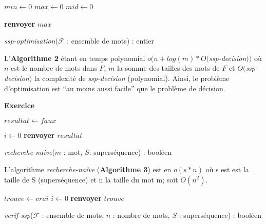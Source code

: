 \documentclass[11pt,letterpaper]{article}
\newcommand{\exo}[1]{\Large \textbf{Exercice \numprint{#1}} \vspace{10px} \normalsize}
\begin{document}
\begin{algorithm}[H]
    $min \gets 0$\;
    $max \gets 0$\;
    $mid \gets 0$\;
    
    \textbf{renvoyer} $max$\;
    
    \caption{\textit{ssp-optimisation}($\mathcal{F}$ : ensemble de mots) : entier}
\end{algorithm}

\vspace{10px}

L'\textbf{Algorithme 2} étant en temps polynomial $o(n+log(m)*O($\textit{ssp-decision}$))$ où $n$ est le nombre de mots dans $F$, $m$ la somme des tailles des mots de $F$ et $O($\textit{ssp-decision}$)$ la complexité de \textit{ssp-decision} (polynomial). Ainsi, le problème d’optimisation est ``au moins aussi facile'' que le problème de décision.\\

\vspace{20px}

\exo{2}\\

\begin{algorithm}[H]
 $resultat \gets faux$\;
 
        $i \gets 0$\;
\textbf{renvoyer} $resultat$\;
    
    \caption{\textit{recherche-naive}($m$ : mot, $S$: superséquence) : booléen}
\end{algorithm}

\vspace{10px}

L'algorithme \textit{recherche-naïve} (\textbf{Algorithme 3}) est en $o(s*n)$ où s est est la taille de S (superséquence) et n la taille du mot m; soit $O(n^2)$.\\

\begin{algorithm}[H]
    $trouve \gets vrai$\;
    $i \gets 0$\;
    \textbf{renvoyer} $trouve$\;
    
    \caption{\textit{verif-ssp}($\mathcal{F}$ : ensemble de mots, $n$ : nombre de mots, $S$ : superséquence) : booléen}
\end{algorithm}
\end{document}
